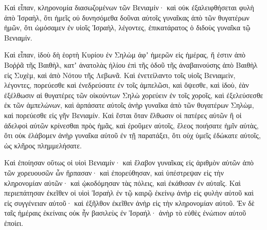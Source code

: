 {Καὶ εἶπαν, κληρονομία διασωζομένων τῶν Βενιαμίν· καὶ οὐκ ἐξαλειφθήσεται φυλὴ ἀπὸ Ἰσραὴλ,
ὅτι ἡμεῖς οὐ δυνησόμεθα δοῦναι αὐτοῖς γυναῖκας ἀπὸ τῶν θυγατέρων ἡμῶν, ὅτι ὠμόσαμεν ἐν υἱοῖς Ἰσραὴλ, λέγοντες, ἐπικατάρατος ὁ διδοὺς γυναῖκα τῷ Βενιαμίν.
\par }{\PP {}Καὶ εἶπαν, ἰδοὺ δὴ ἑορτὴ Κυρίου ἐν Σηλὼμ ἀφʼ ἡμερῶν εἰς ἡμέρας, ἥ ἐστιν ἀπὸ Βοῤῥᾶ τῆς Βαιθὴλ, κατʼ ἀνατολὰς ἡλίου ἐπὶ τῆς ὁδοῦ τῆς ἀναβαινούσης ἀπὸ Βαιθὴλ εἰς Συχὲμ, καὶ ἀπὸ Νότου τῆς Λεβωνᾶ.
Καὶ ἐνετείλαντο τοῖς υἱοῖς Βενιαμεὶν, λέγοντες, πορεύεσθε καὶ ἐνεδρεύσατε ἐν τοῖς ἀμπελῶσι,
καὶ ὄψεσθε, καὶ ἰδοὺ, ἐὰν ἐξέλθωσιν αἱ θυγατέρες τῶν οἰκούντων Σηλὼ χορεύειν ἐν τοῖς χοροῖς, καὶ ἐξελεύσεσθε ἐκ τῶν ἀμπελώνων, καὶ ἁρπάσατε αὑτοῖς ἀνὴρ γυναῖκα ἀπὸ τῶν θυγατέρων Σηλὼμ, καὶ πορεύεσθε εἰς γῆν Βενιαμίν.
Καὶ ἔσται ὅταν ἔλθωσιν οἱ πατέρες αὐτῶν ἢ οἱ ἀδελφοὶ αὐτῶν κρίνεσθαι πρὸς ἡμᾶς, καὶ ἐροῦμεν αὐτοῖς, ἔλεος ποιήσατε ἡμῖν αὐτὰς, ὅτι οὐκ ἐλάβομεν ἀνὴρ γυναῖκα αὐτοῦ ἐν τῇ παρατάξει, ὅτι οὐχ ὑμεῖς ἐδώκατε αὐτοῖς, ὡς κλῆρος πλημμελήσατε.
\par }{\PP {}Καὶ ἐποίησαν οὕτως οἱ υἱοὶ Βενιαμίν· καὶ ἔλαβον γυναῖκας εἰς ἀριθμὸν αὐτῶν ἀπὸ τῶν χορευουσῶν ὧν ἥρπασαν· καὶ ἐπορεύθησαν, καὶ ὑπέστρεψαν εἰς τὴν κληρονομίαν αὐτῶν· καὶ ᾠκοδόμησαν τὰς πόλεις, καὶ ἐκάθισαν ἐν αὐταῖς.
Καὶ περιεπάτησαν ἐκεῖθεν οἱ υἱοὶ Ἰσραὴλ ἐν τῷ καιρῷ ἐκείνῳ ἀνὴρ εἰς φυλὴν αὐτοῦ καὶ εἰς συγγένειαν αὐτοῦ· καὶ ἐξῆλθον ἐκεῖθεν ἀνὴρ εἰς τὴν κληρονομίαν αὐτοῦ.
Ἐν δὲ ταῖς ἡμέραις ἐκείναις οὐκ ἦν βασιλεὺς ἐν Ἰσραήλ· ἀνὴρ τὸ εὐθὲς ἐνώπιον αὐτοῦ ἐποίει.
\par }